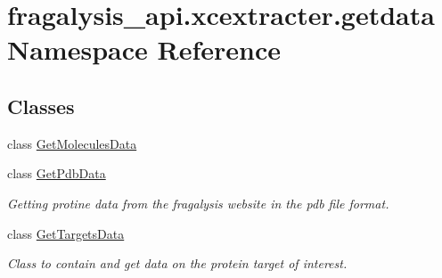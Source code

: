 \hypertarget{namespacefragalysis__api_1_1xcextracter_1_1getdata}{}\section{fragalysis\+\_\+api.\+xcextracter.\+getdata Namespace Reference}
\label{namespacefragalysis__api_1_1xcextracter_1_1getdata}
\subsection*{Classes}
\begin{DoxyCompactItemize}
\item 
class \hyperlink{classfragalysis__api_1_1xcextracter_1_1getdata_1_1_get_molecules_data}{Get\+Molecules\+Data}
\item 
class \hyperlink{classfragalysis__api_1_1xcextracter_1_1getdata_1_1_get_pdb_data}{Get\+Pdb\+Data}
\begin{DoxyCompactList}\small\item\em Getting protine data from the fragalysis website in the pdb file format. \end{DoxyCompactList}\item 
class \hyperlink{classfragalysis__api_1_1xcextracter_1_1getdata_1_1_get_targets_data}{Get\+Targets\+Data}
\begin{DoxyCompactList}\small\item\em Class to contain and get data on the protein target of interest. \end{DoxyCompactList}\end{DoxyCompactItemize}
